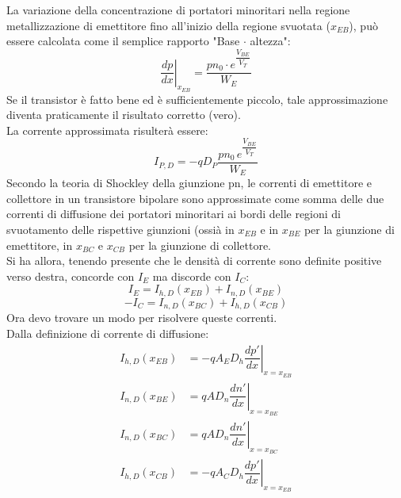 %
La variazione della concentrazione di portatori minoritari nella regione metallizzazione di emettitore fino all'inizio della regione svuotata ($x_{EB}$), può essere calcolata come il semplice rapporto "Base $\cdot$ altezza":
\begin{equation}
    \left. \dfrac{dp}{dx}\right|_{x_{EB}}=\dfrac{pn_0 \cdot e^{\dfrac{V_{BE}}{V_T}}}{W_E}
\end{equation}
Se il transistor è fatto bene ed è sufficientemente piccolo, tale approssimazione diventa praticamente il risultato corretto (vero).\\
La corrente approssimata risulterà essere:
\begin{equation}
    I_{P,D}=-qD_P \dfrac{pn_0 \, e^{\dfrac{V_{BE}}{V_T}}}{W_E}
\end{equation}
%
Secondo la teoria di Shockley della giunzione pn, le correnti di emettitore e collettore in un transistore bipolare sono approssimate come somma delle due correnti
di diffusione dei portatori minoritari ai bordi delle regioni di svuotamento delle
rispettive giunzioni (ossià in $x_{EB}$ e in $x_{BE}$ per la giunzione di emettitore, in $x_{BC}$
e $x_{CB}$ per la giunzione di collettore.\\
Si ha allora, tenendo presente che le densità di corrente sono definite positive verso destra,
concorde con $I_E$ ma discorde con $I_C$: 
%
\begin{equation}
    I_E= I_{h,D}(x_{EB}) + I_{n,D}(x_{BE})
\end{equation}
%
\begin{equation}
    -I_C= I_{n,D}(x_{BC}) + I_{h,D}(x_{CB})
\end{equation}
%
Ora devo trovare un modo per risolvere queste correnti.\\
Dalla definizione di corrente di diffusione:
\begin{align}
    I_{h,D}(x_{EB})&=-qA_ED_h \left.\dfrac{dp'}{dx}\right|_{x=x_{EB}}\\
    I_{n,D}(x_{BE})&=qAD_n \left.\dfrac{dn'}{dx}\right|_{x=x_{BE}}\\
    I_{n,D}(x_{BC})&=qAD_n \left.\dfrac{dn'}{dx}\right|_{x=x_{BC}}\\
    I_{h,D}(x_{CB})&=-qA_CD_h \left.\dfrac{dp'}{dx}\right|_{x=x_{EB}}
\end{align}

